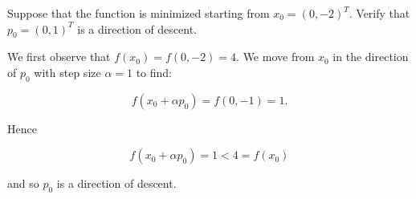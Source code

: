 Suppose that the function is minimized starting from $x_0 = (0, -2)^T$. Verify that $p_0 = (0, 1)^T$ is a direction of 
descent.

\begin{solution}
    We first observe that $f(x_0) = f(0, -2) = 4$. We move from $x_0$ in the direction of $p_0$ with step size 
    $\alpha = 1$ to find:

    $$
    f(x_0 + \alpha p_0) = f(0, -1) = 1.
    $$

    Hence

    $$
    f(x_0 + \alpha p_0) = 1 < 4 = f(x_0)
    $$

    and so $p_0$ is a direction of descent.
    \ \\
\end{solution}
